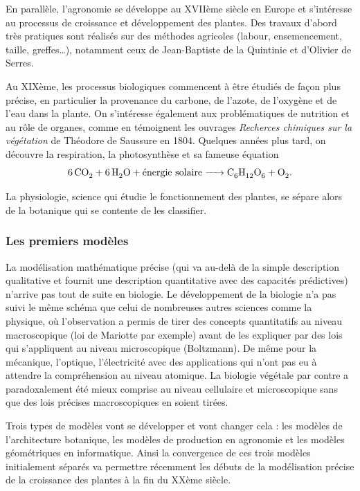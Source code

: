 En parallèle, l’agronomie se développe au XVIIème siècle en Europe
et s’intéresse au processus de croissance et développement des plantes.
Des travaux d’abord très pratiques sont réalisés sur des méthodes agricoles 
(labour, ensemencement, taille, greffes…), notamment ceux de
Jean-Baptiste de la Quintinie et d'Olivier de Serres.

Au XIXème, les processus biologiques commencent à être étudiés de façon plus
précise, en particulier la provenance du carbone, de l’azote,
de l’oxygène et de l’eau dans la plante.
On s'intéresse également aux problématiques de nutrition et
au rôle de organes, comme en témoignent les ouvrages
\emph{Recherces chimiques sur la végétation} de Théodore de Saussure en 1804.
Quelques années plus tard, on découvre la respiration, la photosynthèse
et sa fameuse équation
\begin{equation}
	\ce{6CO2 + 6H2O + \text{énergie solaire} -> C6H12O6 + O2 }.
  \label{eq:photosynthese}
\end{equation}

La physiologie, science qui étudie le fonctionnement des plantes,
se sépare alors de la botanique qui se contente de les classifier.

\subsubsection{Les premiers modèles}

La modélisation mathématique précise (qui va au-delà de la simple
description qualitative et fournit une description quantitative
avec des capacités prédictives) n’arrive pas tout de suite en biologie. 
Le développement de la biologie n’a pas suivi le même schéma que celui de
nombreuses autres sciences comme la physique, où l’observation a permis de
tirer des concepts quantitatifs au niveau macroscopique
(loi de Mariotte par exemple) avant de les expliquer par des lois qui s’appliquent au niveau microscopique (Boltzmann). De même pour la mécanique, l’optique, l’électricité avec des applications qui n’ont pas eu à attendre la compréhension au niveau atomique. La biologie végétale par contre a paradoxalement été mieux comprise au niveau cellulaire et microscopique sans que des lois précises macroscopiques en soient tirées.

Trois types de modèles vont se développer et vont changer cela : les modèles de l’architecture botanique, les modèles de production en agronomie et les modèles géométriques en informatique. Ainsi la convergence de ces trois modèles initialement séparés va permettre récemment les débuts de la modélisation précise de la croissance des plantes à la fin du XXème siècle.  

